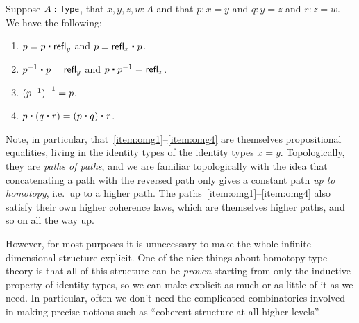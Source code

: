 \begin{lem}\label{thm:omg}%
  Suppose $A:\mathsf{Type}$, that $x,y,z,w:A$ and that $p:x= y$ and $q:y = z$ and $r:z=w$.
  We have the following:
  \begin{enumerate}
  \item $p= p\ct \refl{y}$ and $p = \refl{x} \ct p$.\label{item:omg1}
  \item $\opp{p}\ct p=  \refl{y}$ and $p\ct \opp{p}= \refl{x}$.
  \item $\mathord{{(\mathord{{p}^{-1}})}^{-1}}= p$.
  \item $p\ct (q\ct r)=  (p\ct q)\ct r$.\label{item:omg4}
  \end{enumerate}
\end{lem}

Note, in particular, that~\ref{item:omg1}--\ref{item:omg4} are themselves propositional equalities, living in the identity types of the identity types $x=y$.
Topologically, they are \emph{paths of paths}, and we are familiar topologically with the idea that concatenating a path with the reversed path only gives a constant path \emph{up to homotopy}, i.e.\ up to a higher path.
The paths~\ref{item:omg1}--\ref{item:omg4} also satisfy their own higher coherence laws, which are themselves higher paths, and so on all the way up.

However, for most purposes it is unnecessary to make the whole infinite-dimensional structure explicit.
One of the nice things about homotopy type theory is that all of this structure can be \emph{proven} starting from only the inductive property of identity types, so we can make explicit as much or as little of it as we need.
In particular, often we don't need the complicated combinatorics involved in making precise notions such as ``coherent structure at all higher levels''.

